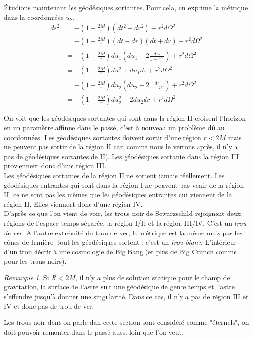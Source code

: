 \documentclass[a4paper,11pt]{report}
\theoremstyle{definition}
\theoremstyle{plain}
\theoremstyle{definition}
\theoremstyle{remark}
\newtheorem{rmk}{Remarque}[chapter]
\begin{document}
            Étudions maintenant les géodésiques sortantes. Pour cela, on exprime la métrique dans la coordonnées $u_2$.
            \begin{align}
                ds^2 &= -\left( 1-\frac{2M}{r} \right)(dt^2-dr^2)+r^2 d\Omega^2\\
                &= -\left( 1-\frac{2M}{r} \right)(dt-dr)(dt+dr)+r^2 d\Omega^2\\
                &= -\left( 1-\frac{2M}{r} \right)du_1\left( du_1-2\frac{dr_*}{1-\frac{2M}{r}} \right)+r^2 d\Omega^2\\
                &= -\left( 1-\frac{2M}{r} \right)du^2_1+du_1dr+r^2 d\Omega^2\\
                &= -\left( 1-\frac{2M}{r} \right)du_2\left( du_2+2\frac{dr}{1-\frac{2M}{r}} \right)+r^2 d\Omega^2\\
                &= -\left( 1-\frac{2M}{r} \right)du^2_2-2du_2dr+r^2 d\Omega^2
            \end{align}
            
            On voit que les géodésiques sortantes qui sont dans la région II croisent l'horizon en un paramètre affinne dans le passé, c'est à nouveau un problème dû au coordonnées. Les géodésiques sortantes doivent sortir d'une région $r<2M$ mais ne peuvent pas sortir de la région II car, comme nous le verrons après, il n'y a pas de géodésiques sortantes de II). Les géodésiques sortante dans la région III proviennent donc d'une région III.\\
            
            Les géodésiques sortantes de la région II ne sortent jamais réellement. 
            Les géodésiques entrantes qui sont dans la région I ne peuvent pas venir de la région II, ce ne sont pas les mêmes que les géodésiques entrantes qui viennent de la région II. Elles viennent donc d'une région IV.\\
            
            
            D'après ce que l'on vient de voir, les trous noir de Scwarzschild rejoignent deux régions de l'espace-temps séparée, la région I/II et la région III/IV. C'est un \textit{trou de ver}. A l'autre extrémité du trou de ver, la métrique est la même mais pas les cônes de lumière, tout les géodésiques sortent : c'est un \textit{trou blanc}. L'intérieur d'un trou décrit à une cosmologie de Big Bang (et plus de Big Crunch comme pour les trous noirs). 
            
            \begin{rmk}
                Si $R<2M$, il n'y a plus de solution statique pour le champ de gravitation, la surface de l'astre suit une géodésique de genre temps et l'astre s'effondre jusqu'à donner une singularité. Dans ce cas, il n'y a pas de région III et IV et donc pas de trou de ver.
                
                
                Les trous noir dont on parle dan cette section sont considéré comme "éternels", on doit pouvoir remonter dans le passé aussi loin que l'on veut.
            \end{rmk}
            
\end{document}
